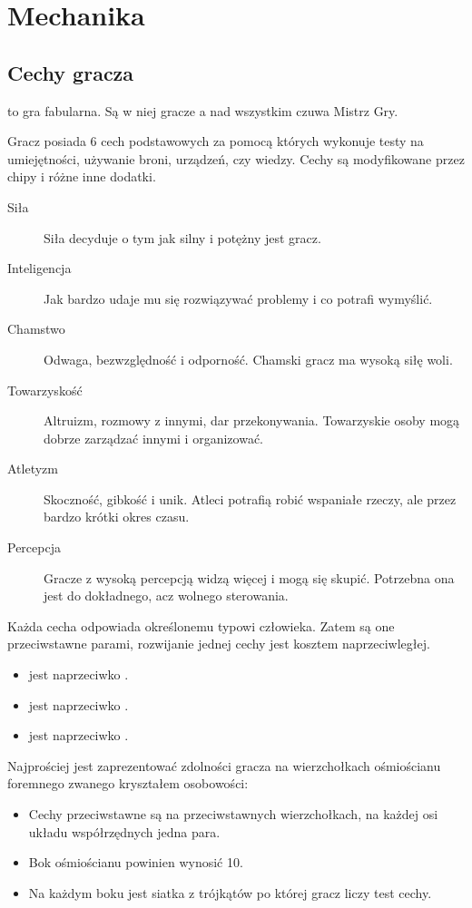 \chapter{Mechanika}
\section{Cechy gracza}
\kosmoramus{} to gra fabularna. Są w niej gracze a nad wszystkim czuwa Mistrz Gry.

Gracz posiada 6 cech podstawowych za pomocą których wykonuje testy na umiejętności, używanie broni, urządzeń, czy wiedzy.
Cechy są modyfikowane przez chipy i różne inne dodatki.
\begin{description}
 \item[Siła \abs{}] Siła decyduje o tym jak silny i potężny jest gracz.
 \item[Inteligencja \abi{}] Jak bardzo udaje mu się rozwiązywać problemy i co potrafi wymyślić.
 \item[Chamstwo \abh{}] Odwaga, bezwzględność i odporność. Chamski gracz ma wysoką siłę woli.
 \item[Towarzyskość \abt{}] Altruizm, rozmowy z innymi, dar przekonywania. Towarzyskie osoby mogą dobrze zarządzać innymi i organizować.
 \item[Atletyzm \aba{}] Skoczność, gibkość i unik. Atleci potrafią robić wspaniałe rzeczy, ale przez bardzo krótki okres czasu.
 \item[Percepcja \abp{}] Gracze z wysoką percepcją widzą więcej i mogą się skupić. Potrzebna ona jest do dokładnego, acz wolnego sterowania.
\end{description}

Każda cecha odpowiada określonemu typowi człowieka.
Zatem są one przeciwstawne parami, rozwijanie jednej cechy jest kosztem naprzeciwległej.
\begin{itemize}
 \item \abs{} jest naprzeciwko \abi{}.
 \item \abh{} jest naprzeciwko \abt{}.
 \item \aba{} jest naprzeciwko \abp{}.
\end{itemize}

Najprościej jest zaprezentować zdolności gracza na wierzchołkach ośmiościanu foremnego zwanego kryształem osobowości:
\begin{itemize}
 \item Cechy przeciwstawne są na przeciwstawnych wierzchołkach, na każdej osi układu współrzędnych jedna para.
 \item Bok ośmiościanu powinien wynosić 10.
 \item Na każdym boku jest siatka z trójkątów po której gracz liczy test cechy.
\end{itemize}

